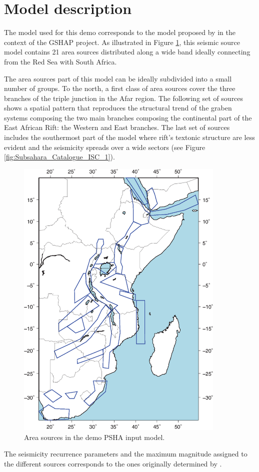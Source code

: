 %
\section{Model description}
The model used for this demo corresponds to the model proposed by 
\citet{midzi1999} in the context of the GSHAP project.
As illustrated in Figure \ref{fig:ssa_area_sources}, this 
seismic source model contains 21 area sources distributed along a wide 
band ideally connecting from the Red Sea with South Africa.

The area sources part of this model can be ideally subdivided into a small 
number of groups.
To the north, a first class of area sources cover the three branches 
of the triple junction in the Afar region. 
The following set of sources shows a spatial pattern that reproduces
the structural trend of the graben systems composing the two main 
branches composing the continental part of the East African Rift:
the Western and East branches. The last set of sources includes the 
southermost part of the model where rift's textonic structure are less
evident and the seismicity spreads over a wide sectors (see Figure
\ref{fig:Subsahara_Catalogue_ISC_1}).
%
\begin{figure}[ht]
	\centering
	\includegraphics[width=10cm]
        {./figures/ssa_area_sources.eps}
	\caption{Area sources in the demo PSHA input model.}
	\label{fig:ssa_area_sources}
\end{figure}
%
The seismicity recurrence parameters and the maximum magnitude 
assigned to the different sources corresponds to the ones originally
determined by \citet{midzi1999}.

